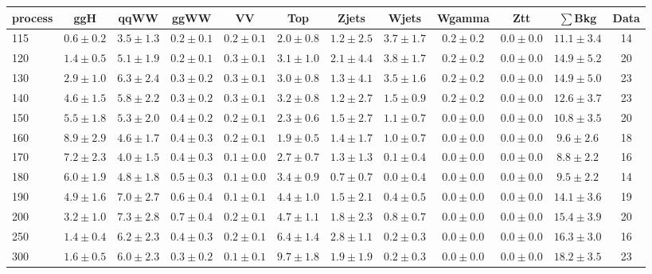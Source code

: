 \begin{table}
{\footnotesize
 \begin{center}
 \begin{tabular}{l c c c c c c c c c c c }
 \hline
 process & ggH & qqWW & ggWW & VV & Top & Zjets & Wjets & Wgamma & Ztt & $\sum$Bkg & Data \\
 \hline
115 & $0.6\pm0.2$ & $3.5\pm1.3$ & $0.2\pm0.1$ & $0.2\pm0.1$ & $2.0\pm0.8$ & $1.2\pm2.5$ & $3.7\pm1.7$ & $0.2\pm0.2$ & $0.0\pm0.0$ & $11.1\pm3.4$ & 14 \\
120 & $1.4\pm0.5$ & $5.1\pm1.9$ & $0.2\pm0.1$ & $0.3\pm0.1$ & $3.1\pm1.0$ & $2.1\pm4.4$ & $3.8\pm1.7$ & $0.2\pm0.2$ & $0.0\pm0.0$ & $14.9\pm5.2$ & 20 \\
130 & $2.9\pm1.0$ & $6.3\pm2.4$ & $0.3\pm0.2$ & $0.3\pm0.1$ & $3.0\pm0.8$ & $1.3\pm4.1$ & $3.5\pm1.6$ & $0.2\pm0.2$ & $0.0\pm0.0$ & $14.9\pm5.0$ & 23 \\
140 & $4.6\pm1.5$ & $5.8\pm2.2$ & $0.3\pm0.2$ & $0.3\pm0.1$ & $3.2\pm0.8$ & $1.2\pm2.7$ & $1.5\pm0.9$ & $0.2\pm0.2$ & $0.0\pm0.0$ & $12.6\pm3.7$ & 23 \\
150 & $5.5\pm1.8$ & $5.3\pm2.0$ & $0.4\pm0.2$ & $0.2\pm0.1$ & $2.3\pm0.6$ & $1.5\pm2.7$ & $1.1\pm0.7$ & $0.0\pm0.0$ & $0.0\pm0.0$ & $10.8\pm3.5$ & 20 \\
160 & $8.9\pm2.9$ & $4.6\pm1.7$ & $0.4\pm0.3$ & $0.2\pm0.1$ & $1.9\pm0.5$ & $1.4\pm1.7$ & $1.0\pm0.7$ & $0.0\pm0.0$ & $0.0\pm0.0$ & $9.6\pm2.6$ & 18 \\
170 & $7.2\pm2.3$ & $4.0\pm1.5$ & $0.4\pm0.3$ & $0.1\pm0.0$ & $2.7\pm0.7$ & $1.3\pm1.3$ & $0.1\pm0.4$ & $0.0\pm0.0$ & $0.0\pm0.0$ & $8.8\pm2.2$ & 16 \\
180 & $6.0\pm1.9$ & $4.8\pm1.8$ & $0.5\pm0.3$ & $0.1\pm0.0$ & $3.4\pm0.9$ & $0.7\pm0.7$ & $0.0\pm0.4$ & $0.0\pm0.0$ & $0.0\pm0.0$ & $9.5\pm2.2$ & 14 \\
190 & $4.9\pm1.6$ & $7.0\pm2.7$ & $0.6\pm0.4$ & $0.1\pm0.1$ & $4.4\pm1.0$ & $1.5\pm2.1$ & $0.4\pm0.5$ & $0.0\pm0.0$ & $0.0\pm0.0$ & $14.1\pm3.6$ & 19 \\
200 & $3.2\pm1.0$ & $7.3\pm2.8$ & $0.7\pm0.4$ & $0.2\pm0.1$ & $4.7\pm1.1$ & $1.8\pm2.3$ & $0.8\pm0.7$ & $0.0\pm0.0$ & $0.0\pm0.0$ & $15.4\pm3.9$ & 20 \\
250 & $1.4\pm0.4$ & $6.2\pm2.3$ & $0.4\pm0.3$ & $0.2\pm0.1$ & $6.4\pm1.4$ & $2.8\pm1.1$ & $0.2\pm0.3$ & $0.0\pm0.0$ & $0.0\pm0.0$ & $16.3\pm3.0$ & 16 \\
300 & $1.6\pm0.5$ & $6.0\pm2.3$ & $0.3\pm0.2$ & $0.1\pm0.1$ & $9.7\pm1.8$ & $1.9\pm1.9$ & $0.2\pm0.3$ & $0.0\pm0.0$ & $0.0\pm0.0$ & $18.2\pm3.5$ & 23 \\

\end{tabular}
\end{center}}
\end{table}
